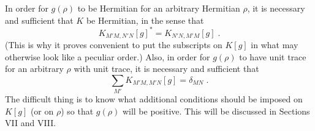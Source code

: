 In order for $g(\rho)$ to be Hermitian for an arbitrary Hermitian $\rho$, it is necessary and sufficient that $K$ be Hermitian, in the sense that
 \begin{equation}
K_{M'M,N'N}[g]^*=K_{N'N,M'M}[g]\;.
\end{equation}
(This is why it proves convenient to put the subscripts on $K[g]$ in what may otherwise look like a peculiar order.)
Also, in order for $g(\rho)$ to have unit trace for an arbitrary $\rho$ with unit trace, it is necessary and sufficient that
 \begin{equation}
\sum_{M'}K_{M'M,M'N}[g]=\delta_{MN}\;.
\end{equation}
The difficult thing is to know  what additional conditions should be imposed on $K[g]$ (or on $\rho$) so that  $g(\rho)$ will be positive.  This will be discussed in Sections VII and VIII.  







